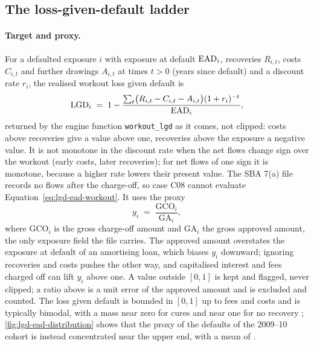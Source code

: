 \subsection{The loss-given-default ladder}
\label{sec:m14}

\paragraph{Target and proxy.} For a defaulted exposure $i$ with exposure at default $\mathrm{EAD}_i$, recoveries $R_{i,t}$, costs $C_{i,t}$ and further drawings $A_{i,t}$ at times $t>0$ (years since default) and a discount rate $r_i$, the realised workout loss given default is
\begin{equation}
\mathrm{LGD}_i \;=\; 1-\frac{\sum_{t}\bigl(R_{i,t}-C_{i,t}-A_{i,t}\bigr)(1+r_i)^{-t}}{\mathrm{EAD}_i},
\label{eq:lgd-ead-workout}
\end{equation}
returned by the engine function \texttt{workout\_lgd} as it comes, not clipped: costs above recoveries give a value above one, recoveries above the exposure a negative value. It is not monotone in the discount rate when the net flows change sign over the workout (early costs, later recoveries); for net flows of one sign it is monotone, because a higher rate lowers their present value. The SBA 7(a) file records no flows after the charge-off, so case C08 cannot evaluate Equation~\eqref{eq:lgd-ead-workout}. It uses the proxy
\begin{equation}
y_i \;=\; \frac{\mathrm{GCO}_i}{\mathrm{GA}_i},
\label{eq:lgd-ead-proxy}
\end{equation}
where $\mathrm{GCO}_i$ is the gross charge-off amount and $\mathrm{GA}_i$ the gross approved amount, the only exposure field the file carries. The approved amount overstates the exposure at default of an amortising loan, which biases $y_i$ downward; ignoring recoveries and costs pushes the other way, and capitalised interest and fees charged off can lift $y_i$ above one. A value outside $[0,1]$ is kept and flagged, never clipped; a ratio above  is a unit error of the approved amount and is excluded and counted. The loss given default is bounded in $[0,1]$ up to fees and costs and is typically bimodal, with a mass near zero for cures and near one for no recovery \citep{lgd-ead:tong2013}; \cref{fig:lgd-ead-distribution} shows that the proxy of the  defaults of the 2009--10 cohort is instead concentrated near the upper end, with a mean of .

